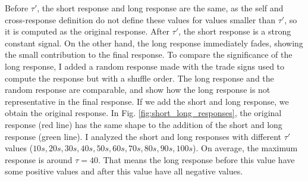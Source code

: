 Before $\tau'$, the short response and long response are the same, as the self
and cross-response definition do not define these values for values smaller
than $\tau '$, so it is computed as the original response. After $\tau'$, the
short response is a strong constant signal. On the other hand, the long
response immediately fades, showing the small contribution to the final
response. To compare the significance of the long response, I added a random
response made with the trade signs used to compute the response but with a
shuffle order. The long response and the random response are comparable, and
show how the long response is not representative in the final response.
If we add the short and long response, we obtain the original response. In Fig.
\ref{fig:short_long_responses}, the original response (red line) has the same
shape to the addition of the short and long response (green line). I analyzed
the short and long responses with different $\tau '$ values
($10s, 20s, 30s, 40s, 50s, 60s, 70s, 80s, 90s, 100s$). On average, the maximum
response is around $\tau = 40$. That means the long response before this value
have some positive values and after this value have all negative values.
